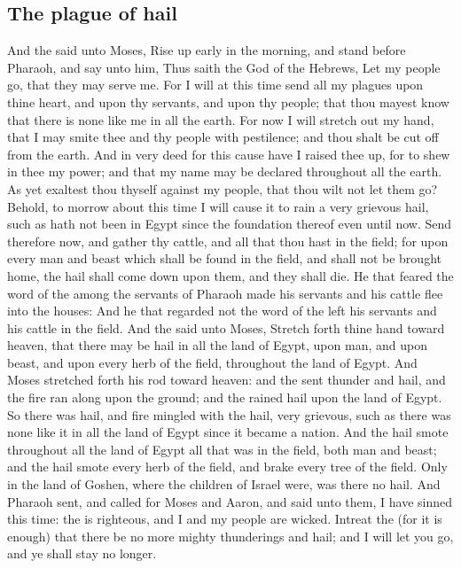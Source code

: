 \begin{biblechapter}
\section*{The plague of hail}
\verse And the \LORD said unto Moses, Rise up early in the morning, and stand before Pharaoh, and say unto him, Thus saith the \LORD God of the Hebrews, Let my people go, that they may serve me.
\verse For I will at this time send all my plagues upon thine heart, and upon thy servants, and upon thy people; that thou mayest know that there is none like me in all the earth.
\verse For now I will stretch out my hand, that I may smite thee and thy people with pestilence; and thou shalt be cut off from the earth.
\verse And in very deed for this cause have I raised thee up, for to shew in thee my power; and that my name may be declared throughout all the earth.
\verse As yet exaltest thou thyself against my people, that thou wilt not let them go?
\verse Behold, to morrow about this time I will cause it to rain a very grievous hail, such as hath not been in Egypt since the foundation thereof even until now.
\verse Send therefore now, and gather thy cattle, and all that thou hast in the field; for upon every man and beast which shall be found in the field, and shall not be brought home, the hail shall come down upon them, and they shall die.
\verse He that feared the word of the \LORD among the servants of Pharaoh made his servants and his cattle flee into the houses:
\verse And he that regarded not the word of the \LORD left his servants and his cattle in the field.
\verse And the \LORD said unto Moses, Stretch forth thine hand toward heaven, that there may be hail in all the land of Egypt, upon man, and upon beast, and upon every herb of the field, throughout the land of Egypt.
\verse And Moses stretched forth his rod toward heaven: and the \LORD sent thunder and hail, and the fire ran along upon the ground; and the \LORD rained hail upon the land of Egypt.
\verse So there was hail, and fire mingled with the hail, very grievous, such as there was none like it in all the land of Egypt since it became a nation.
\verse And the hail smote throughout all the land of Egypt all that was in the field, both man and beast; and the hail smote every herb of the field, and brake every tree of the field.
\verse Only in the land of Goshen, where the children of Israel were, was there no hail.
\verse And Pharaoh sent, and called for Moses and Aaron, and said unto them, I have sinned this time: the \LORD is righteous, and I and my people are wicked.
\verse Intreat the \LORD (for it is enough) that there be no more mighty thunderings and hail; and I will let you go, and ye shall stay no longer.

\end{biblechapter}
